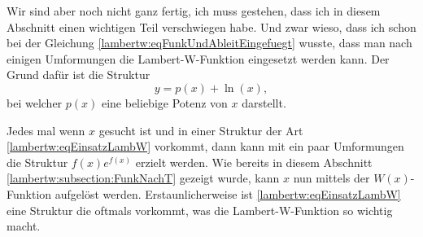 Wir sind aber noch nicht ganz fertig, ich muss gestehen, dass ich in diesem Abschnitt einen wichtigen Teil verschwiegen habe. Und zwar wieso, dass ich schon bei der Gleichung \eqref{lambertw:eqFunkUndAbleitEingefuegt} wusste, dass man nach einigen Umformungen die Lambert-W-Funktion eingesetzt werden kann.
Der Grund dafür ist die Struktur
\begin{equation}
	y
	=
	p(x) +\operatorname{ln}(x),
	\label{lambertw:eqEinsatzLambW}
\end{equation}
bei welcher \(p(x)\) eine beliebige Potenz von \(x\) darstellt. 

Jedes mal wenn \(x\) gesucht ist und in einer Struktur der Art \eqref{lambertw:eqEinsatzLambW} vorkommt, dann kann mit ein paar Umformungen die Struktur \(f(x)e^{f(x)}\) erzielt werden. Wie bereits in diesem Abschnitt \ref{lambertw:subsection:FunkNachT} gezeigt wurde, kann \(x\) nun mittels der \(W(x)\)-Funktion aufgelöst werden. Erstaunlicherweise ist \eqref{lambertw:eqEinsatzLambW} eine Struktur die oftmals vorkommt, was die Lambert-W-Funktion so wichtig macht.
